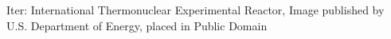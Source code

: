 \documentclass{beamer}
\begin{document}
\begin{frame}
\begin{columns}
\begin{column}{0.5\linewidth}
{{\color{gray} Iter: International Thermonuclear Experimental Reactor, Image published by U.S. Department of Energy, placed in Public Domain}}%
%
\end{column}
\end{columns}
\end{frame}
\end{document}
